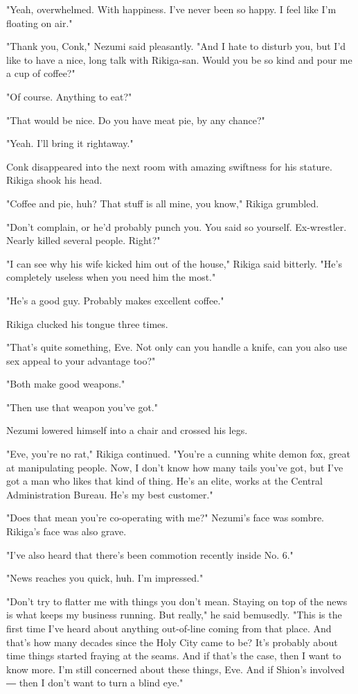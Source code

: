 "Yeah, overwhelmed. With happiness. I've never been so happy. I feel
like I'm floating on air."

"Thank you, Conk," Nezumi said pleasantly. "And I hate to disturb you,
but I'd like to have a nice, long talk with Rikiga-san. Would you be so
kind and pour me a cup of coffee?"

"Of course. Anything to eat?"

"That would be nice. Do you have meat pie, by any chance?"

"Yeah. I'll bring it rightaway."

Conk disappeared into the next room with amazing swiftness for his
stature. Rikiga shook his head.

"Coffee and pie, huh? That stuff is all mine, you know," Rikiga
grumbled.

"Don't complain, or he'd probably punch you. You said so yourself.
Ex-wrestler. Nearly killed several people. Right?"

"I can see why his wife kicked him out of the house," Rikiga said
bitterly. "He's completely useless when you need him the most."

"He's a good guy. Probably makes excellent coffee."

Rikiga clucked his tongue three times.

"That's quite something, Eve. Not only can you handle a knife, can you
also use sex appeal to your advantage too?"

"Both make good weapons."

"Then use that weapon you've got."

Nezumi lowered himself into a chair and crossed his legs.

"Eve, you're no rat," Rikiga continued. "You're a cunning white demon
fox, great at manipulating people. Now, I don't know how many tails
you've got, but I've got a man who likes that kind of thing. He's an
elite, works at the Central Administration Bureau. He's my best
customer."

"Does that mean you're co-operating with me?" Nezumi's face was sombre.
Rikiga's face was also grave.

"I've also heard that there's been commotion recently inside No. 6."

"News reaches you quick, huh. I'm impressed."

"Don't try to flatter me with things you don't mean. Staying on top of
the news is what keeps my business running. But really," he said
bemusedly. "This is the first time I've heard about anything out-of-line
coming from that place. And that's how many decades since the Holy City
came to be? It's probably about time things started fraying at the
seams. And if that's the case, then I want to know more. I'm still
concerned about these things, Eve. And if Shion's involved ― then I
don't want to turn a blind eye."

